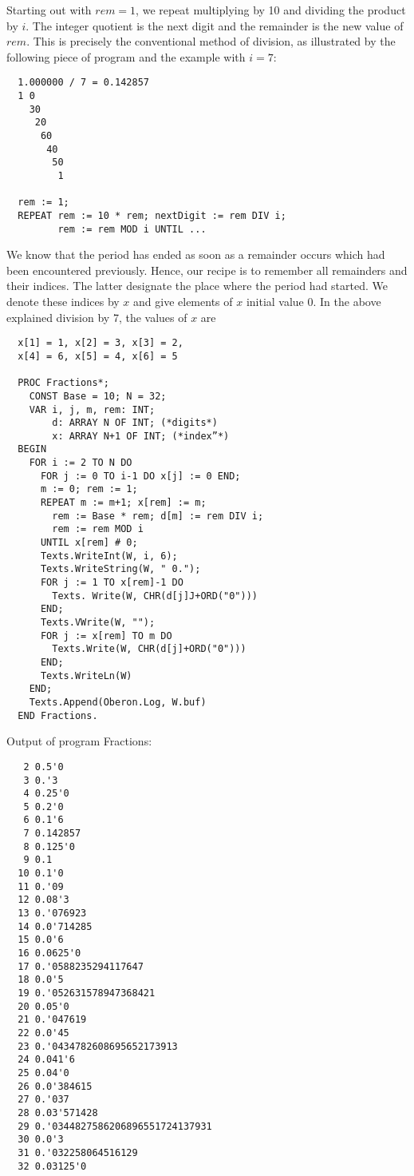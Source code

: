 Starting out with $rem = 1$, we repeat multiplying by 10 and dividing the product by $i$.
The integer quotient is the next digit and the remainder is the new value of $rem$. This
is precisely the conventional method of division, as illustrated by the following piece
of program and the example with $i = 7$:
\begin{verbatim}
  1.000000 / 7 = 0.142857
  1 0
    30
     20
      60
       40
        50
         1
 
  rem := 1;
  REPEAT rem := 10 * rem; nextDigit := rem DIV i;
         rem := rem MOD i UNTIL ...
\end{verbatim}
We know that the period has ended as soon as a remainder occurs which had been encountered
previously. Hence, our recipe is to remember all remainders and their indices. The latter
designate the place where the period had started. We denote these indices by $x$ and give
elements of $x$ initial value 0. In the above explained division by 7, the values of $x$ are
\begin{verbatim}
  x[1] = 1, x[2] = 3, x[3] = 2,
  x[4] = 6, x[5] = 4, x[6] = 5
 
  PROC Fractions*;
    CONST Base = 10; N = 32;
    VAR i, j, m, rem: INT;
        d: ARRAY N OF INT; (*digits*)
        x: ARRAY N+1 OF INT; (*index”*)
  BEGIN
    FOR i := 2 TO N DO
      FOR j := 0 TO i-1 DO x[j] := 0 END;
      m := 0; rem := 1;
      REPEAT m := m+1; x[rem] := m;
        rem := Base * rem; d[m] := rem DIV i;
        rem := rem MOD i
      UNTIL x[rem] # 0;
      Texts.WriteInt(W, i, 6);
      Texts.WriteString(W, " 0.");
      FOR j := 1 TO x[rem]-1 DO
        Texts. Write(W, CHR(d[j]J+ORD("0")))
      END;
      Texts.VWrite(W, "");
      FOR j := x[rem] TO m DO
        Texts.Write(W, CHR(d[j]+ORD("0")))
      END;
      Texts.WriteLn(W)
    END;
    Texts.Append(Oberon.Log, W.buf)
  END Fractions.
\end{verbatim}
Output of program Fractions:
\begin{verbatim}
   2 0.5'0
   3 0.'3
   4 0.25'0
   5 0.2'0
   6 0.1'6
   7 0.142857
   8 0.125'0
   9 0.1
  10 0.1'0
  11 0.'09
  12 0.08'3
  13 0.'076923
  14 0.0'714285
  15 0.0'6
  16 0.0625'0
  17 0.'0588235294117647
  18 0.0'5
  19 0.'052631578947368421
  20 0.05'0
  21 0.'047619
  22 0.0'45
  23 0.'0434782608695652173913
  24 0.041'6
  25 0.04'0
  26 0.0'384615
  27 0.'037
  28 0.03'571428
  29 0.'0344827586206896551724137931
  30 0.0'3
  31 0.'032258064516129
  32 0.03125'0
\end{verbatim}


